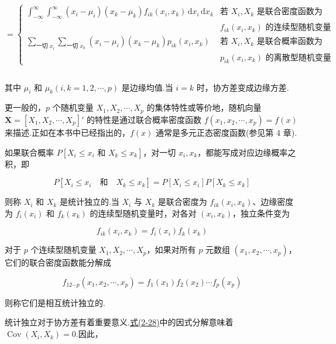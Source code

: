 
\[
=
\begin{cases}
\displaystyle\int_{-\infty}^{\infty}\int_{-\infty}^{\infty}(x_i-\mu_i)(x_k-\mu_k)f_{ik}(x_i,x_k)\,\mathrm{d}x_i\,\mathrm{d}x_k & \text{若 } X_i,X_k \text{ 是联合密度函数为}\\
& f_{ik}(x_i,x_k) \text{ 的连续型随机变量}\\[1ex]
\displaystyle\sum_{\text{一切 }x_i}\sum_{\text{一切 }x_k}(x_i-\mu_i)(x_k-\mu_k)p_{ik}(x_i,x_k) & \text{若 } X_i,X_k \text{ 是联合概率函数为}\\
& p_{ik}(x_i,x_k) \text{ 的离散型随机变量}
\end{cases}
\]

\label{eq:2-26}
\begin{equation}
\tag{2-26}
\end{equation}

其中 $\mu_i$ 和 $\mu_k(i,k=1,2,\cdots,p)$ 是边缘均值.当 $i=k$ 时，协方差变成边缘方差.

更一般的，$p$ 个随机变量 $X_1,X_2,\cdots,X_p$ 的集体特性或等价地，随机向量 $\bm{X}=[X_1,X_2,\cdots,X_p]'$ 的特性是通过联合概率密度函数 $f(x_1,x_2,\cdots,x_p)=f(x)$ 来描述.正如在本书中已经指出的，$f(x)$ 通常是多元正态密度函数(参见第 4 章).

如果联合概率 $P[X_i\leqslant x_i \text{ 和 } X_k\leqslant x_k]$，对一切 $x_i,x_k$，都能写成对应边缘概率之积，即

\label{eq:2-27}
\begin{equation}
P[X_i\leqslant x_i \quad \text{和} \quad X_k\leqslant x_k]=P[X_i\leqslant x_i]P[X_k\leqslant x_k] \tag{2-27}
\end{equation}

则称 $X_i$ 和 $X_k$ 是统计独立的.当 $X_i$ 与 $X_k$ 是联合密度为 $f_{ik}(x_i,x_k)$、边缘密度为 $f_i(x_i)$ 和 $f_k(x_k)$ 的连续型随机变量时，对各对 $(x_i,x_k)$，独立条件变为

\[
f_{ik}(x_i,x_k)=f_i(x_i)f_k(x_k)
\]

对于 $p$ 个连续型随机变量 $X_1,X_2,\cdots,X_p$，如果对所有 $p$ 元数组 $(x_1,x_2,\cdots,x_p)$，它们的联合密度函数能分解成

\label{eq:2-28}
\begin{equation}
f_{12\cdots p}(x_1,x_2,\cdots,x_p)=f_1(x_1)f_2(x_2)\cdots f_p(x_p) \tag{2-28}
\end{equation}

则称它们是相互统计独立的.

统计独立对于协方差有着重要意义.\hyperref[eq:2-28]{式(2-28)}中的因式分解意味着 $\operatorname{Cov}(X_i,X_k)=0$.因此，

